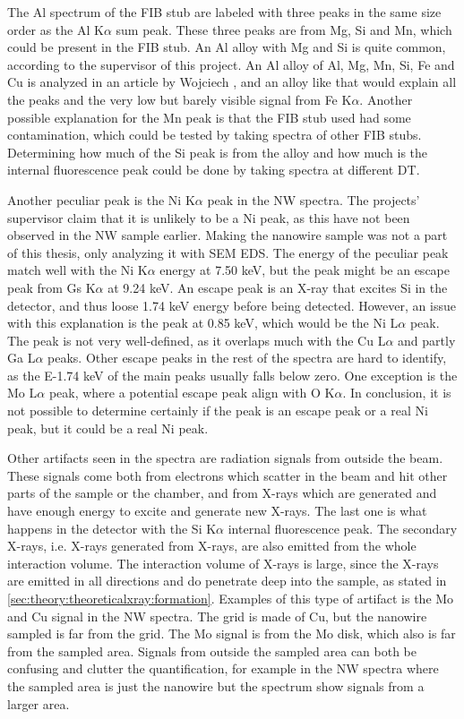The Al spectrum of the FIB stub are labeled with three peaks in the same size order as the Al K$\alpha$ sum peak.
These three peaks are from Mg, Si and Mn, which could be present in the FIB stub.
An Al alloy with Mg and Si is quite common, according to the supervisor of this project.
An Al alloy of Al, Mg, Mn, Si, Fe and Cu is analyzed in an article by Wojciech \cite{al_alloy}, and an alloy like that would explain all the peaks and the very low but barely visible signal from Fe K$\alpha$.
Another possible explanation for the Mn peak is that the FIB stub used had some contamination, which could be tested by taking spectra of other FIB stubs.
Determining how much of the Si peak is from the alloy and how much is the internal fluorescence peak could be done by taking spectra at different DT.


Another peculiar peak is the Ni K$\alpha$ peak in the NW spectra.
The projects' supervisor claim that it is unlikely to be a Ni peak, as this have not been observed in the NW sample earlier.
Making the nanowire sample was not a part of this thesis, only analyzing it with SEM EDS.
The energy of the peculiar peak match well with the Ni K$\alpha$ energy at 7.50 keV, but the peak might be an escape peak from Gs K$\alpha$ at 9.24 keV.
An escape peak is an X-ray that excites Si in the detector, and thus loose 1.74 keV energy before being detected.
However, an issue with this explanation is the peak at 0.85 keV, which would be the Ni L$\alpha$ peak.
The peak is not very well-defined, as it overlaps much with the Cu L$\alpha$  and partly Ga L$\alpha$ peaks.
Other escape peaks in the rest of the spectra are hard to identify, as the E-1.74 keV of the main peaks usually falls below zero.
One exception is the Mo L$\alpha$ peak, where a potential escape peak align with O K$\alpha$.
In conclusion, it is not possible to determine certainly if the peak is an escape peak or a real Ni peak, but it could be a real Ni peak.



Other artifacts seen in the spectra are radiation signals from outside the beam.
These signals come both from electrons which scatter in the beam and hit other parts of the sample or the chamber, and from X-rays which are generated and have enough energy to excite and generate new X-rays.
The last one is what happens in the detector with the Si K$\alpha$ internal fluorescence peak.
The secondary X-rays, i.e. X-rays generated from X-rays, are also emitted from the whole interaction volume.
The interaction volume of X-rays is large, since the X-rays are emitted in all directions and do penetrate deep into the sample, as stated in \cref{sec:theory:theoreticalxray:formation}.
Examples of this type of artifact is the Mo and Cu signal in the NW spectra.
The grid is made of Cu, but the nanowire sampled is far from the grid.
The Mo signal is from the Mo disk, which also is far from the sampled area.
Signals from outside the sampled area can both be confusing and clutter the quantification, for example in the NW spectra where the sampled area is just the nanowire but the spectrum show signals from a larger area.


